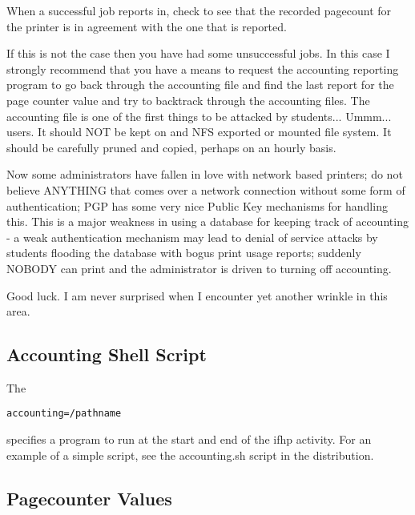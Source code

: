 \documentclass[a4paper]{article}
\begin{document}
When a successful job reports in,  check to see that the recorded pagecount
for the printer is in agreement with the one that is reported.

If this is not the case then you have had some unsuccessful jobs.
In this case I strongly recommend that you have a means to request the
accounting reporting program to go back through the accounting file and
find the last report for the page counter value and try to backtrack
through the accounting files.  The accounting file is one of the first
things to be attacked by students... Ummm...  users.  It should NOT be
kept on and NFS exported or mounted file system.  It should be
carefully pruned and copied, perhaps on an hourly basis.

Now some administrators have fallen in love with network based printers;
do not believe ANYTHING that comes over a network connection without
some form of authentication;  PGP has some very nice Public Key
mechanisms for handling this.  This is a major weakness in using a
database for keeping track of accounting - a weak authentication
mechanism may lead to denial of service attacks by students flooding
the database with bogus print usage reports;  suddenly NOBODY can print
and the administrator is driven to turning off accounting.

Good luck.  I am never surprised when I encounter yet another wrinkle in
this area.


\subsection{Accounting Shell Script}

The 
\begin{tscreen}
\begin{verbatim}
accounting=/pathname
\end{verbatim}
\end{tscreen}

specifies a program to run
at the start and end of the
{\ttfamily ifhp} activity.
For an example of a simple script,
see the accounting.sh script in the distribution.


\subsection{Pagecounter Values}
\end{document}
